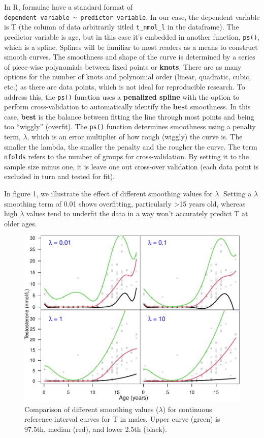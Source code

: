 \documentclass[]{elsarticle} %
\begin{document}
In R, formulae have a standard format of
\texttt{dependent\ variable\ \textasciitilde{}\ predictor\ variable}. In
our case, the dependent variable is T (the column of data arbitrarily
titled \texttt{t\_nmol\_l} in the dataframe). The predictor variable is
age, but in this case it's embedded in another function, \texttt{ps()},
which is a spline. Splines will be familiar to most readers as a means
to construct smooth curves. The smoothness and shape of the curve is
determined by a series of piece-wise polynomials between fixed points or
\textbf{knots}. There are as many options for the number of knots and
polynomial order (linear, quadratic, cubic, etc.) as there are data
points, which is not ideal for reproducible research. To address this,
the \texttt{ps()} function uses a \textbf{penalized spline} with the
option to perform cross-validation to automatically identify the
\textbf{best} smoothness. In this case, \textbf{best} is the balance
between fitting the line through most points and being too ``wiggly''
(overfit). The \texttt{ps()} function determines smoothness using a
penalty term, \(\lambda\), which is an error multiplier of how rough
(wiggly) the curve is. The smaller the lambda, the smaller the penalty
and the rougher the curve. The term \texttt{nfolds} refers to the number
of groups for cross-validation. By setting it to the sample size minus
one, it is leave one out cross-over validation (each data point is
excluded in turn and tested for fit).

In figure 1, we illustrate the effect of different smoothing values for
\(\lambda\). Setting a \(\lambda\) smoothing term of 0.01 shows
overfitting, particularly \textgreater15 years old, whereas high
\(\lambda\) values tend to underfit the data in a way won't accurately
predict T at older ages.

\begin{figure}[H]
\includegraphics{smoothingfig1-1} \caption{\label{fig:fig1}Comparison of different smoothing values ($\lambda$) for continuous reference interval curves for T in males. Upper curve (green) is 97.5th, median (red), and lower 2.5th (black).}\label{fig:smoothingfig1}
\end{figure}
\end{document}
